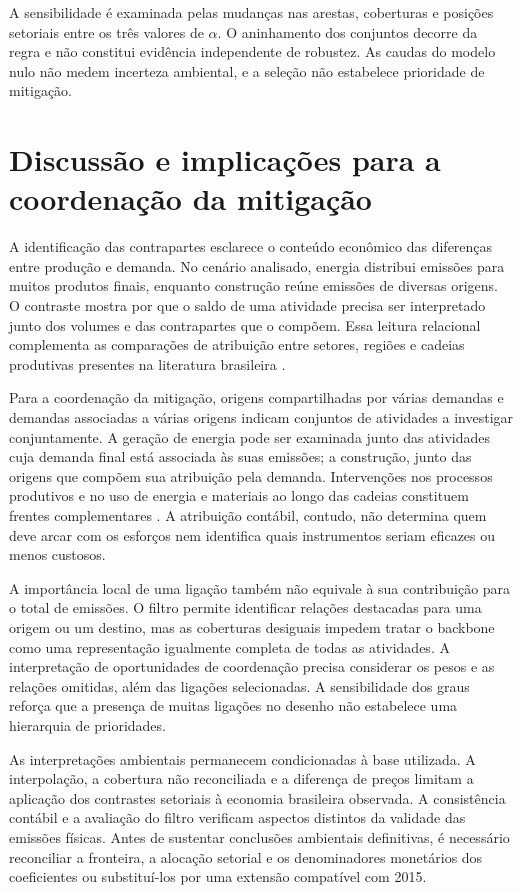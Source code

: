 \documentclass[12pt]{article}
\begin{document}
A sensibilidade é examinada pelas mudanças nas arestas, coberturas e posições setoriais entre os três valores de $\alpha$. O aninhamento dos conjuntos decorre da regra e não constitui evidência independente de robustez. As caudas do modelo nulo não medem incerteza ambiental, e a seleção não estabelece prioridade de mitigação.


\section{Discussão e implicações para a coordenação da mitigação}

A identificação das contrapartes esclarece o conteúdo econômico das diferenças entre produção e demanda. No cenário analisado, energia distribui emissões para muitos produtos finais, enquanto construção reúne emissões de diversas origens. O contraste mostra por que o saldo de uma atividade precisa ser interpretado junto dos volumes e das contrapartes que o compõem. Essa leitura relacional complementa as comparações de atribuição entre setores, regiões e cadeias produtivas presentes na literatura brasileira \parencite{imori2015,sanguinetAzzoni2024,montoyaEtAl2026}.

Para a coordenação da mitigação, origens compartilhadas por várias demandas e demandas associadas a várias origens indicam conjuntos de atividades a investigar conjuntamente. A geração de energia pode ser examinada junto das atividades cuja demanda final está associada às suas emissões; a construção, junto das origens que compõem sua atribuição pela demanda. Intervenções nos processos produtivos e no uso de energia e materiais ao longo das cadeias constituem frentes complementares \parencite{rissman2020}. A atribuição contábil, contudo, não determina quem deve arcar com os esforços nem identifica quais instrumentos seriam eficazes ou menos custosos.

A importância local de uma ligação também não equivale à sua contribuição para o total de emissões. O filtro permite identificar relações destacadas para uma origem ou um destino, mas as coberturas desiguais impedem tratar o backbone como uma representação igualmente completa de todas as atividades. A interpretação de oportunidades de coordenação precisa considerar os pesos e as relações omitidas, além das ligações selecionadas. A sensibilidade dos graus reforça que a presença de muitas ligações no desenho não estabelece uma hierarquia de prioridades.

As interpretações ambientais permanecem condicionadas à base utilizada. A interpolação, a cobertura não reconciliada e a diferença de preços limitam a aplicação dos contrastes setoriais à economia brasileira observada. A consistência contábil e a avaliação do filtro verificam aspectos distintos da validade das emissões físicas. Antes de sustentar conclusões ambientais definitivas, é necessário reconciliar a fronteira, a alocação setorial e os denominadores monetários dos coeficientes ou substituí-los por uma extensão compatível com 2015.
\end{document}
